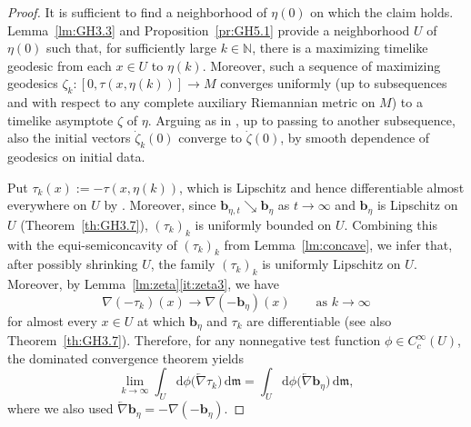 \documentclass[a4paper,11pt]{article}
\numberwithin{equation}{section}
\theoremstyle{definition}
\theoremstyle{plain}
\newcommand{\lra}{\longrightarrow}
\newcommand{\dd}{\mathrm{d}}
\newcommand{\N}{\ensuremath{\mathbb{N}}}
\newcommand{\fm}{\ensuremath{\mathfrak{m}}}
\newcommand{\bb}{\ensuremath{\mathbf{b}}}
\newcommand{\rev}[1]{\overleftarrow{#1}}
\begin{document}
\begin{proof}
It is sufficient to find a neighborhood of $\eta(0)$ on which the claim holds.
Lemma~\ref{lm:GH3.3} and Proposition~\ref{pr:GH5.1} provide a neighborhood $U$ of $\eta(0)$ such that, for sufficiently large $k \in \N$, there is a maximizing timelike geodesic from each $x \in U$ to $\eta(k)$.
Moreover, such a sequence of maximizing geodesics $\zeta_k \colon [0,\tau(x,\eta(k))] \lra M$ converges uniformly (up to  subsequences and with respect to any complete auxiliary Riemannian metric on $M$) to a timelike asymptote $\zeta$ of $\eta$.
Arguing as in  \cite[Lemma 3.4]{GH}, up to passing to another subsequence, also the  initial vectors $\dot \zeta_k(0)$ converge to $\dot\zeta(0)$, by smooth dependence of geodesics  on initial data.

Put $\tau_k(x):=-\tau(x,\eta(k))$, which is Lipschitz and hence differentiable almost everywhere on $U$ by \cite[Theorem 3.11]{BO}.
Moreover, since $\bb_{\eta,t} \searrow \bb_{\eta}$ as $t \to \infty$ and $\bb_{\eta}$ is Lipschitz on $U$ (Theorem~\ref{th:GH3.7}), $(\tau_k)_k$ is uniformly bounded on $U$.
Combining this with the equi-semiconcavity of $(\tau_k)_k$ from Lemma~\ref{lm:concave}, we infer that, after possibly shrinking $U$, the family $(\tau_k)_k$ is uniformly Lipschitz on $U$.
Moreover, by Lemma~\ref{lm:zeta}\eqref{it:zeta3}, we have
\[
\nabla(-\tau_k)(x)\to \nabla(-\bb_\eta)(x)\qquad\text{as }k\to\infty
\]
for almost every $x\in U$ at which $\bb_\eta$ and $\tau_k$ are differentiable (see also Theorem~\ref{th:GH3.7}).
Therefore, for any nonnegative test function $\phi\in C_c^\infty(U)$, the dominated convergence theorem yields
\[
\lim_{k\to\infty}\int_U \dd\phi\bigl(\rev{\nabla}\tau_k\bigr)\,\dd\fm
=
\int_U \dd\phi\bigl(\rev{\nabla}\bb_\eta\bigr)\,\dd\fm,
\]
where we also used $\rev{\nabla}\bb_\eta=-\nabla(-\bb_\eta)$.


\end{proof}
\end{document}
